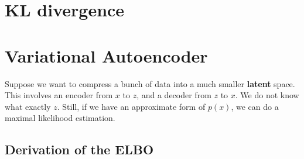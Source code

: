 \documentclass[hyperref, a4paper, 12pt]{report}
\newcommand*{\concept}[1]{{\textbf{#1}}}
\begin{document}
\section{KL divergence}

\section{Variational Autoencoder}

Suppose we want to compress a bunch of data into a much smaller \concept{latent} space.
This involves an encoder from $x$ to $z$, and a decoder from $z$ to $x$.
We do not know what exactly $z$.
Still, if we have an approximate form of $p(x)$,
we can do a maximal likelihood estimation.

\subsection{Derivation of the ELBO}
\end{document}
